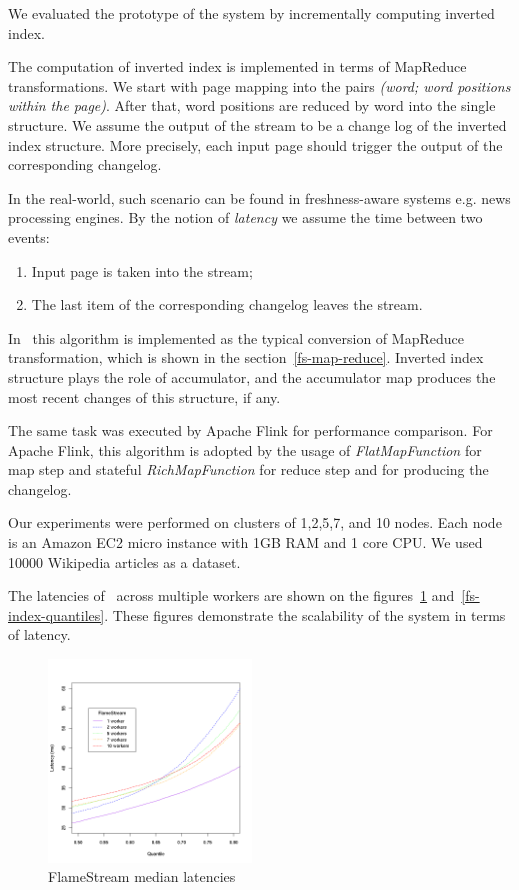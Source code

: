 
\label{fs-experiments-section}

We evaluated the prototype of the system by incrementally computing inverted index.

The computation of inverted index is implemented in terms of MapReduce transformations. We start with page mapping into the pairs {\it (word; word positions within the page)}. After that, word positions are reduced by word into the single structure. We assume the output of the stream to be a change log of the inverted index structure. More precisely, each input page should trigger the output of the corresponding changelog. 

In the real-world, such scenario can be found in freshness-aware systems e.g. news processing engines. By the notion of {\it latency} we assume the time between two events: 
\begin{enumerate}
    \item Input page is taken into the stream;
    \item The last item of the corresponding changelog leaves the stream.
\end{enumerate}

In \FlameStream\ this algorithm is implemented as the typical conversion of MapReduce transformation, which is shown in the section~\ref{fs-map-reduce}. Inverted index structure plays the role of accumulator, and the accumulator map produces the most recent changes of this structure, if any.

The same task was executed by Apache Flink for performance comparison. For Apache Flink, this algorithm is adopted by the usage of {\it FlatMapFunction} for map step and stateful {\it RichMapFunction} for reduce step and for producing the changelog.

Our experiments were performed on clusters of 1,2,5,7, and 10 nodes. Each node is an Amazon EC2 micro instance with 1GB RAM and 1 core CPU. We used 10000 Wikipedia articles as a dataset. 

The latencies of \FlameStream\ across multiple workers are shown on the figures~\ref{fs-index-median} and~\ref{fs-index-quantiles}. These figures demonstrate the scalability of the system in terms of latency.

\begin{figure}[htbp]
  \centering
  \includegraphics[width=0.48\textwidth]{pics/fs-index-median}
  \caption{FlameStream median latencies}
  \label {fs-index-median}
\end{figure}

